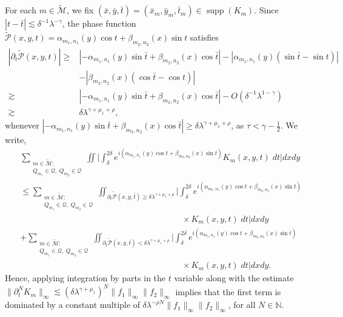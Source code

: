 \documentclass[a4paper,reqno]{amsart}
\theoremstyle{definition}
\theoremstyle{remark}
\numberwithin{equation}{section}
\newcommand{\Q}{{\mathbb Q}}
\newcommand{\N}{{\mathbb N}}
\begin{document}
	For each ${m}\in\mathcal{\widetilde{M}}$, we fix $(\bar x,\bar y,\bar t)=(\bar x_{{m}},\bar y_{{m}},\bar t_{{m}})\in\operatorname*{supp}(K_{{m}})$. Since $|t-\bar t|\lesssim\delta^{-1}\lambda^{-\gamma}$, the phase function $\mathcal{\widetilde{P}}(x,y,t)=\alpha_{m_1,n_1}(y)\cos t+\beta_{m_2,n_2}(x)\sin t$ satisfies
	\begin{align*}
		|\partial_t\mathcal{\widetilde{P}}(x,y,t)|\geq& |-\alpha_{m_1,n_1}(y)\sin\bar t+\beta_{m_2,n_2}(x)\cos\bar t|-|\alpha_{m_1,n_1}(y)(\sin \bar t-\sin t)|\\
		&-|\beta_{m_2,n_2}(x)(\cos\bar t-\cos t)|\\
		\gtrsim&|-\alpha_{m_1,n_1}(y)\sin\bar t+\beta_{m_2,n_2}(x)\cos\bar t|-O(\delta^{-1}\lambda^{1-\gamma})\\
		\gtrsim&\delta\lambda^{\gamma+\mu_1+\rho},
	\end{align*}
	whenever $|-\alpha_{m_1,n_1}(y)\sin\bar t+\beta_{m_2,n_2}(x)\cos\bar t|\geq\delta\lambda^{\gamma+\mu_1+\rho}$, as $\tau<\gamma-\frac{1}{2}$.
	We write,
	\begin{align*}
		&\sum_{\substack{{m}\in\mathcal{\widetilde{M}}:\\Q_{m_1}\in\mathcal{Q},\;Q_{m_2}\in\mathcal{Q}}}\iint\bigg|\int_\delta^{2\delta}e^{i(\alpha_{m_1,n_1}(y)\cos t+\beta_{m_2,n_2}(x)\sin t)}K_{{m}}(x,y,t)\;dt\bigg|dxdy\\
		&\leq\sum_{\substack{{m}\in\mathcal{\widetilde{M}}:\\Q_{m_1}\in\mathcal{Q},\;Q_{m_2}\in\mathcal{Q}}}\iint_{\partial_t\mathcal{\widetilde{P}}(x,y,\bar t)\geq\delta\lambda^{\gamma+\mu_1+\rho}}\bigg|\int_\delta^{2\delta}e^{i(\alpha_{m_1,n_1}(y)\cos t+\beta_{m_2,n_2}(x)\sin t)}\\
		&\hspace{8cm}\times K_{{m}}(x,y,t)\;dt\bigg|dxdy\\
		&+\sum_{\substack{{m}\in\mathcal{\widetilde{M}}:\\Q_{m_1}\in\mathcal{Q},\;Q_{m_2}\in\mathcal{Q}}}\iint_{\partial_t\mathcal{\widetilde{P}}(x,y,\bar t)<\delta\lambda^{\gamma+\mu_1+\rho}}\bigg|\int_\delta^{2\delta}e^{i(\alpha_{m_1,n_1}(y)\cos t+\beta_{m_2,n_2}(x)\sin t)}\\
		&\hspace{8cm}\times K_{{m}}(x,y,t)\;dt\bigg|dxdy.
	\end{align*}
	Hence, applying integration by parts in the $t$ variable along with the estimate $\|\partial_t^N K_{{m}}\|_\infty\lesssim(\delta\lambda^{\gamma+\mu_1})^N\|f_1\|_\infty\|f_2\|_\infty$ implies that the first term is dominated by a constant multiple of $\delta\lambda^{-\rho N}\|f_1\|_\infty\|f_2\|_\infty$, for all $N\in\N$. 
	
\end{document}
